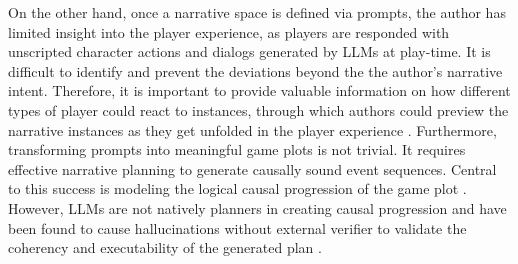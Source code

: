 On the other hand, once a narrative space is defined via prompts, the author has limited insight into the player experience, as players are responded with unscripted character actions and dialogs generated by LLMs at play-time. It is difficult to identify and prevent the deviations beyond the the author's narrative intent. Therefore, it is important to provide valuable information on how different types of player could react to instances, through which authors could preview the narrative instances as they get unfolded in the player experience \cite{kim2023language}. Furthermore, transforming prompts into meaningful game plots is not trivial. It requires effective narrative planning to generate causally sound event sequences. Central to this success is modeling the logical causal progression of the game plot \cite{riedl2010narrative}. However, LLMs are not natively planners in creating causal progression and have been found to cause hallucinations without external verifier to validate the coherency and executability of the generated plan \cite{kambhampati2024llms}. 
